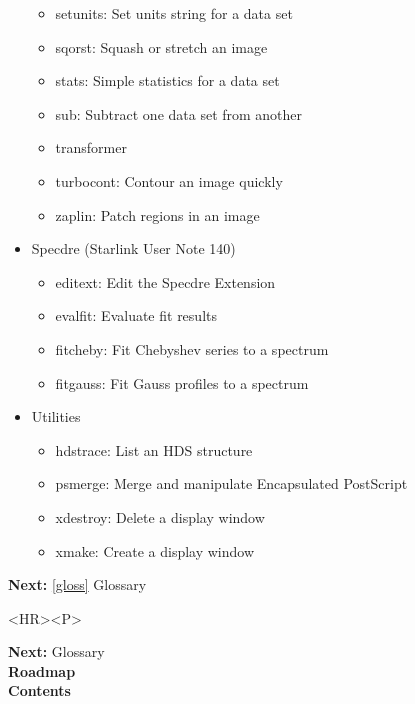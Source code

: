 \documentclass[11pt]{article}
\newenvironment{latexonly}{}{}
\newcommand{\htmlref}[2]{#1}
\newcommand{\xref}[3]{#1}
\begin{document}
\begin{itemize}
\begin{itemize}
   \item \xref{setunits}{sun95}{SETUNITS}: Set units string for a data set
   \item \xref{sqorst}{sun95}{SQORST}: Squash or stretch an image
   \item \xref{stats}{sun95}{STATS}: Simple statistics for a data set
   \item \xref{sub}{sun95}{SUB}: Subtract one data set from another
   \item \xref{transformer}{sun95}{TRANSFORMER}
   \item \xref{turbocont}{sun95}{TURBOCONT}: Contour an image quickly
   \item \xref{zaplin}{sun95}{ZAPLIN}: Patch regions in an image
   \end{itemize}
\item Specdre \xref{(Starlink User Note 140)}{sun140}{}
   \begin{itemize}
   \item \xref{editext}{sun140}{EDITEXT}: Edit the Specdre Extension
   \item \xref{evalfit}{sun140}{EVALFIT}: Evaluate fit results
   \item \xref{fitcheby}{sun140}{FITCHEBY}: Fit Chebyshev series to a spectrum
   \item \xref{fitgauss}{sun140}{FITGAUSS}: Fit Gauss profiles to a spectrum
   \end{itemize}
\item Utilities
   \begin{itemize}
   \item \xref{hdstrace}{sun102}{}: List an HDS structure
   \item \xref{psmerge}{sun164}{}: Merge and manipulate Encapsulated PostScript
   \item \xref{xdestroy}{sun130}{xdestroyCommand}: Delete a display window
   \item \xref{xmake}{sun130}{xmakeCommand}: Create a display window
   \end{itemize}
\end{itemize}

\begin{latexonly}
{\bf Next:} \ref{gloss} Glossary\\
\end{latexonly}

\begin{htmlonly}
\begin{rawhtml} <HR><P> \end{rawhtml}
{\bf \htmlref{Next:}{gloss}} Glossary\\
{\bf \htmlref{Roadmap}{roadmap}}\\
{\bf \htmlref{Contents}{stardoccontents}}\\
\end{htmlonly}
\end{document}

